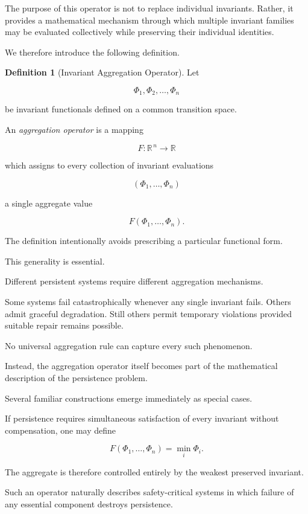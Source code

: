 \documentclass[11pt]{book}
\numberwithin{equation}{chapter}
\theoremstyle{definition}
\newtheorem{definition}{Definition}[chapter]
\theoremstyle{plain}
\begin{document}
The purpose of this operator is not to replace individual invariants. Rather, it provides a mathematical mechanism through which multiple invariant families may be evaluated collectively while preserving their individual identities.

We therefore introduce the following definition.

\begin{definition}[Invariant Aggregation Operator]

Let

\[
\Phi_1,\Phi_2,\ldots,\Phi_n
\]

be invariant functionals defined on a common transition space.

An \emph{aggregation operator} is a mapping

\[
F:
\mathbb{R}^{\,n}
\longrightarrow
\mathbb{R}
\]

which assigns to every collection of invariant evaluations

\[
(\Phi_1,\ldots,\Phi_n)
\]

a single aggregate value

\[
F(\Phi_1,\ldots,\Phi_n).
\]

\end{definition}

The definition intentionally avoids prescribing a particular functional form.

This generality is essential.

Different persistent systems require different aggregation mechanisms.

Some systems fail catastrophically whenever any single invariant fails. Others admit graceful degradation. Still others permit temporary violations provided suitable repair remains possible.

No universal aggregation rule can capture every such phenomenon.

Instead, the aggregation operator itself becomes part of the mathematical description of the persistence problem.

Several familiar constructions emerge immediately as special cases.

If persistence requires simultaneous satisfaction of every invariant without compensation, one may define

\[
F(\Phi_1,\ldots,\Phi_n)
=
\min_i \Phi_i.
\]

The aggregate is therefore controlled entirely by the weakest preserved invariant.

Such an operator naturally describes safety-critical systems in which failure of any essential component destroys persistence.
\end{document}
